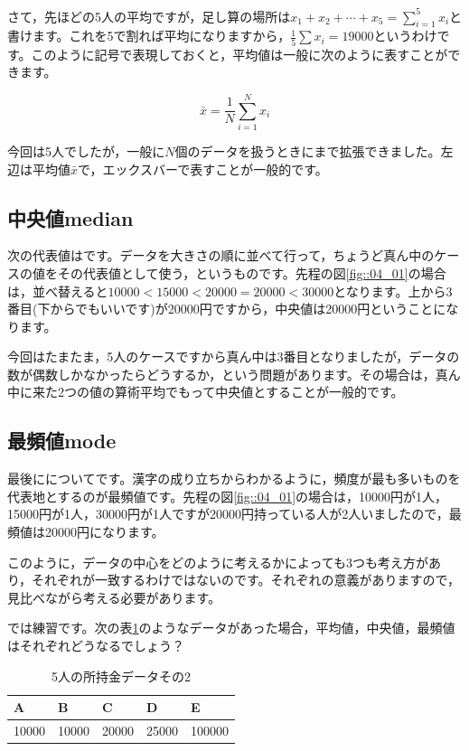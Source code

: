 \documentclass{ltjsbook}
\begin{document}
さて，先ほどの5人の平均ですが，足し算の場所は$x_1+x_2+\cdots+x_5=\sum_{i=1}^5 x_i$と書けます。これを5で割れば平均になりますから，$\frac{1}{5}\sum x_i = 19000$というわけです。このように記号で表現しておくと，平均値は一般に次のように表すことができます。

\[ \bar{x} = \frac{1}{N}\sum_{i=1}^N x_i \]

今回は5人でしたが，一般に$N$個のデータを扱うときにまで拡張できました。左辺は平均値$\bar{x}$で，エックスバーで表すことが一般的です。
\subsection{中央値median}
次の代表値はです。データを大きさの順に並べて行って，ちょうど真ん中のケースの値をその代表値として使う，というものです。先程の図\ref{fig::04_01}の場合は，並べ替えると$10000<15000<20000=20000<30000$となります。上から3番目(下からでもいいです)が20000円ですから，中央値は20000円ということになります。

今回はたまたま，5人のケースですから真ん中は3番目となりましたが，データの数が偶数しかなかったらどうするか，という問題があります。その場合は，真ん中に来た2つの値の算術平均でもって中央値とすることが一般的です。

\subsection{最頻値mode}
最後にについてです。漢字の成り立ちからわかるように，頻度が最も多いものを代表地とするのが最頻値です。先程の図\ref{fig::04_01}の場合は，10000円が1人，15000円が1人，30000円が1人ですが20000円持っている人が2人いましたので，最頻値は20000円になります。

このように，データの中心をどのように考えるかによっても3つも考え方があり，それぞれが一致するわけではないのです。それぞれの意義がありますので，見比べながら考える必要があります。

では練習です。次の表\ref{tbl::04_01}のようなデータがあった場合，平均値，中央値，最頻値はそれぞれどうなるでしょう？ 

\begin{table}[ht]
    \centering
    \caption{5人の所持金データその2}
    \begin{tabular}{lllll}
        A& B & C & D & E\\\hline
    10000 & 10000 & 20000 & 25000 & 100000 \\
    \end{tabular}
    \label{tbl::04_01}
    \end{table}
\end{document}
